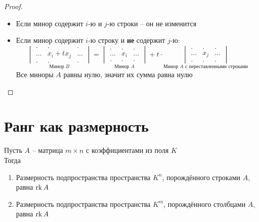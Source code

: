 \begin{proof}
\begin{itemize}
\begin{itemize}
			\item Если минор содержит $ i $-ю и $ j $-ю строки -- он не изменится
			\item Если минор содержит $ i $-ю строку и \textbf{не} содержит $ j $-ю:
			$$
			\underset{\text{Минор } B}{
			\begin{vmatrix}
				. & . & . \\
				... & x_i + tx_j & ... \\
				. & . & .
			\end{vmatrix}} =
			\underset{\text{Минор } A}{
			\begin{vmatrix}
				. & . & . \\
				... & x_i & ... \\
				. & . & .
			\end{vmatrix}} + t \cdot \underset{\text{Минор } A \text{ с переставленными строками}}{
			\begin{vmatrix}
				. & . & . \\
				... & x_j & ... \\
				. & . & .
			\end{vmatrix}} $$
			Все миноры $ A $ равны нулю, значит их сумма равна нулю
		\end{itemize}
	\end{itemize}
\end{proof}

\section{Ранг как размерность}

\begin{theorem}
	Пусть $ A $ -- матрица $ m \times n $ с коэффициентами из поля $ K $ \\
	Тогда
	\begin{enumerate}
		\item Размерность подпространства пространства $ K^n $, порождённого строками $ A $, равна $ \operatorname{rk} A $
		\item Размерность подпространства пространства $ K^m $, порождённого столбцами $ A $, равна $ \operatorname{rk} A $
	\end{enumerate}
\end{theorem}

